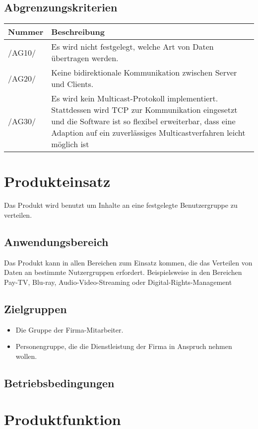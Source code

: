 \documentclass[a4paper,10pt]{article}
\newcommand\addrow[2]{#1 &#2\\ }
\newcommand\addheading[2]{#1 &#2\\ \hline}
\newcommand\tabularhead{\begin{tabular}{lp{13cm}}
\hline
}
\newenvironment{usecase}{\tabularhead}
{\hline\end{tabular}}
\begin{document}
\subsection{Abgrenzungskriterien}
\newcommand{\abgrenzungKuerzel}{AG}
\begin{usecase}
\addheading{Nummer}{Beschreibung}
\addrow{/\abgrenzungKuerzel10/} {Es wird nicht festgelegt, welche Art von Daten
                                 übertragen werden.}
\addrow{/\abgrenzungKuerzel20/} {Keine bidirektionale Kommunikation zwischen Server
                                 und Clients.}
\addrow{/\abgrenzungKuerzel30/} {Es wird kein Multicast-Protokoll implementiert. Stattdessen
                                 wird TCP zur Kommunikation eingesetzt und die Software
                                 ist so flexibel erweiterbar, dass eine Adaption auf
                                 ein zuverlässiges Multicastverfahren leicht möglich ist}
\end{usecase}

\section{Produkteinsatz}
Das Produkt wird benutzt um Inhalte an eine festgelegte Benutzergruppe zu verteilen.
\subsection{Anwendungsbereich}
Das Produkt kann in allen Bereichen zum Einsatz kommen, die das Verteilen von Daten an
bestimmte Nutzergruppen erfordert. Beispielsweise in den Bereichen Pay-TV, Blu-ray, Audio-Video-Streaming oder Digital-Rights-Management
\subsection{Zielgruppen}
\begin{itemize}
\item Die Gruppe der Firma-Mitarbeiter.
\item Personengruppe, die die Dienstleistung der Firma in Anspruch nehmen wollen.
\end{itemize}

\subsection{Betriebsbedingungen}


\section{Produktfunktion}
\end{document}
